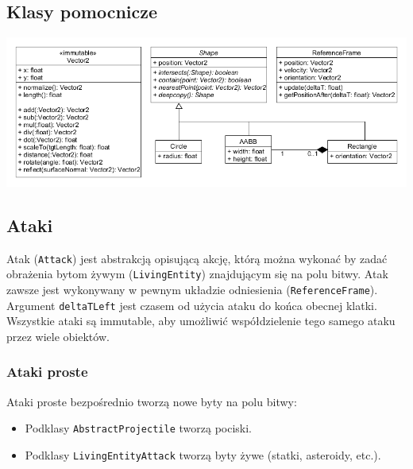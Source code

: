\documentclass{article}
\begin{document}
		\subsection{Klasy pomocnicze}
			\begin{center}
				\includegraphics[width=\linewidth]{classdiag-math.png} \\
			\end{center}
	
		\subsection{Ataki}
			
			Atak (\verb|Attack|) jest abstrakcją opisującą akcję, którą można wykonać by zadać obrażenia bytom żywym (\verb|LivingEntity|) znajdującym się na polu bitwy. Atak zawsze jest wykonywany w pewnym układzie odniesienia (\verb|ReferenceFrame|). Argument \verb|deltaTLeft| jest czasem od użycia ataku do końca obecnej klatki. Wszystkie ataki są immutable, aby umożliwić współdzielenie tego samego ataku przez wiele obiektów.
			
			\subsubsection{Ataki proste}
				Ataki proste bezpośrednio tworzą nowe byty na polu bitwy:
				\begin{itemize}
					\item Podklasy \verb|AbstractProjectile| tworzą pociski.
					\item Podklasy \verb|LivingEntityAttack| tworzą byty żywe (statki, asteroidy, etc.).
				\end{itemize}
			
\end{document}
